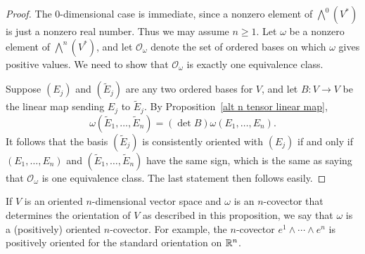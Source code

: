 \begin{proof}
The $0$-dimensional case is immediate, since a nonzero element of $\bigwedge^0(V^*)$ is
just a nonzero real number. Thus we may assume $n\geq1$. Let $\omega$ be a nonzero element of $\bigwedge^n(V^*)$, and let $\mathcal{O}_\omega$ denote the set of ordered bases on which $\omega$ gives positive values. We need to show that $\mathcal{O}_\omega$ is exactly one equivalence class.\par
Suppose $(E_j)$ and $(\widetilde{E}_j)$ are any two ordered bases for $V$, and let $B:V\to V$ be the linear map sending $E_j$ to $\widetilde{E}_j$. By Proposition~\ref{alt n tensor linear map},
\[\omega(\widetilde{E}_1,\dots,\widetilde{E}_n)=(\det B)\omega(E_1,\dots,E_n).\]
It follows that the basis $(\widetilde{E}_j)$ is consistently oriented with $(E_j)$ if and only if $(E_1,\dots,E_n)$ and $(\widetilde{E}_1,\dots,\widetilde{E}_n)$ have the same sign, which is the same as saying that $\mathcal{O}_\omega$ is one equivalence class. The last statement then follows easily.
\end{proof}
If $V$ is an oriented $n$-dimensional vector space and $\omega$ is an $n$-covector that determines the orientation of $V$ as described in this proposition, we say that $\omega$ is a (positively) oriented $n$-covector. For example, the $n$-covector $e^1\wedge\cdots\wedge e^n$ is positively oriented for the standard orientation on $\mathbb{R}^n$.
